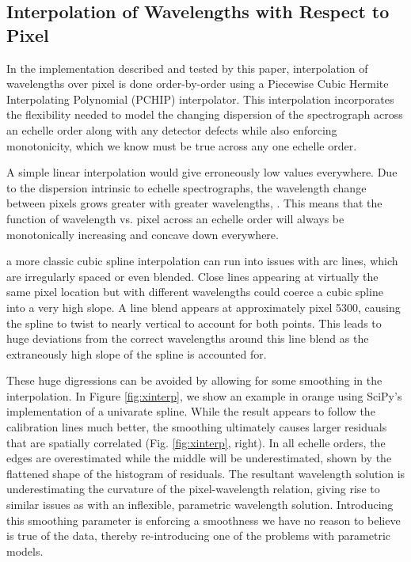 \documentclass[twocolumn,table,xcolor,trackchanges]{aastex63}
\begin{document}
\subsection{Interpolation of Wavelengths with Respect to Pixel}
\label{sec:choice_wvp}
In the implementation described and tested by this paper, interpolation of wavelengths over pixel  is done order-by-order using a Piecewise Cubic Hermite Interpolating Polynomial (PCHIP) interpolator.  This interpolation incorporates the flexibility needed to model the changing dispersion of the spectrograph across an echelle order along with any detector defects while also enforcing monotonicity, which we know must be true across any one echelle order.

A simple linear interpolation would give erroneously low values everywhere.  Due to the dispersion intrinsic to echelle spectrographs, the wavelength change between pixels grows greater with greater wavelengths, .  This means that the function of wavelength vs. pixel across an echelle order will always be monotonically increasing and concave down everywhere.

 a more classic cubic spline interpolation can run into issues with arc lines, which are irregularly spaced or even blended.  Close lines appearing at virtually the same pixel location but with different wavelengths could coerce a cubic spline into a very high slope.    A line blend appears at approximately pixel 5300, causing the spline to twist to nearly vertical to account for both points.  This leads to huge deviations from the correct wavelengths around this line blend as the extraneously high slope of the spline is accounted for.

These huge digressions can be avoided by allowing for some smoothing in the interpolation.  In Figure \ref{fig:xinterp}, we show an example in orange using SciPy's implementation of a univarate spline.  While the result appears to follow the calibration lines much better, the smoothing ultimately causes larger residuals that are spatially correlated (Fig. \ref{fig:xinterp}, right).  In all echelle orders, the edges are overestimated while the middle will be underestimated, shown by the flattened shape of the histogram of residuals.  The resultant wavelength solution is underestimating the curvature of the pixel-wavelength relation, giving rise to similar issues as with an inflexible, parametric wavelength solution.  Introducing this smoothing parameter is enforcing a smoothness we have no reason to believe is true of the data, thereby re-introducing one of the problems with parametric models.
\end{document}
